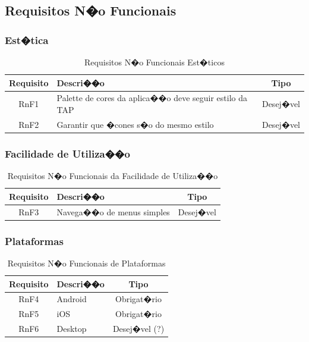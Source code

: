 \subsection{Requisitos N�o Funcionais}
\subsubsection{Est�tica}
\begin{table}[H]
    \centering
    \begin{tabular}{|c|p{9cm}|c|}
        \hline
        \textbf{Requisito} & \textbf{Descri��o} & \textbf{Tipo} \\ 
        \hline
        RnF1 & Palette de cores da aplica��o deve seguir estilo da TAP & Desej�vel \\
        \hline
        RnF2 & Garantir que �cones s�o do mesmo estilo & Desej�vel \\
        \hline
    \end{tabular}
    \caption{Requisitos N�o Funcionais Est�ticos}
    \label{tab:req_n_fun_est}
\end{table}

\subsubsection{Facilidade de Utiliza��o}
\begin{table}[H]
    \centering
    \begin{tabular}{|c|p{9cm}|c|}
         \hline
        \textbf{Requisito} & \textbf{Descri��o} & \textbf{Tipo} \\ 
        \hline
        RnF3 & Navega��o de menus simples & Desej�vel \\ 
        \hline
    \end{tabular}
    \caption{Requisitos N�o Funcionais da Facilidade de Utiliza��o}
    \label{tab:req_n_fun_facilidade}
\end{table}

\subsubsection{Plataformas}
\begin{table}[H]
    \centering
    \begin{tabular}{|c|p{9cm}|c|}
         \hline
        \textbf{Requisito} & \textbf{Descri��o} & \textbf{Tipo} \\ 
        \hline
        RnF4 & Android & Obrigat�rio \\ 
        \hline
        RnF5 & iOS & Obrigat�rio \\
        \hline
        RnF6 & Desktop & Desej�vel (?) \\ 
        \hline
    \end{tabular}
    \caption{Requisitos N�o Funcionais de Plataformas}
    \label{tab:req_n_fun_plat}
\end{table}

